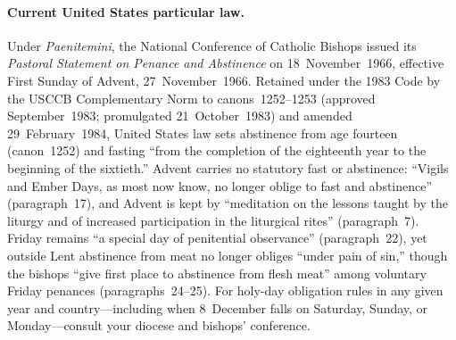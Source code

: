 \paragraph{Current United States particular law.}
Under \textit{Paenitemini}, the National Conference of Catholic Bishops issued its \textit{Pastoral Statement on Penance and Abstinence} on 18~November~1966, effective First Sunday of Advent, 27~November~1966. Retained under the 1983 Code by the USCCB Complementary Norm to canons~1252--1253 (approved September~1983; promulgated 21~October~1983) and amended 29~February~1984, United States law sets abstinence from age fourteen (canon~1252) and fasting ``from the completion of the eighteenth year to the beginning of the sixtieth.'' Advent carries no statutory fast or abstinence: ``Vigils and Ember Days, as most now know, no longer oblige to fast and abstinence'' (paragraph~17), and Advent is kept by ``meditation on the lessons taught by the liturgy and of increased participation in the liturgical rites'' (paragraph~7). Friday remains ``a special day of penitential observance'' (paragraph~22), yet outside Lent abstinence from meat no longer obliges ``under pain of sin,'' though the bishops ``give first place to abstinence from flesh meat'' among voluntary Friday penances (paragraphs~24--25). For holy-day obligation rules in any given year and country---including when 8~December falls on Saturday, Sunday, or Monday---consult your diocese and bishops' conference.

